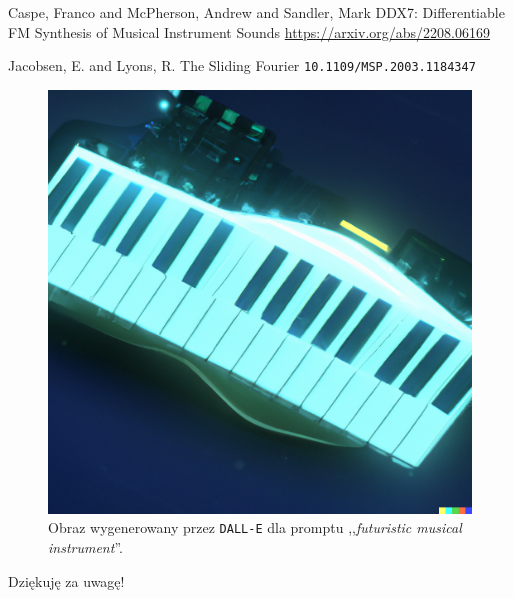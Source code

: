 \documentclass[]{beamer}
\begin{document}
\begin{frame}
  \begin{thebibliography}{99} %

     Caspe, Franco and McPherson, Andrew and Sandler, Mark
    \newblock DDX7: Differentiable FM Synthesis of Musical Instrument Sounds
    \newblock \url{https://arxiv.org/abs/2208.06169}

     Jacobsen, E. and Lyons, R.
    \newblock The Sliding Fourier
    \newblock \texttt{10.1109/MSP.2003.1184347}

  \end{thebibliography}
\end{frame}

\begin{frame}

  \vspace{-0.5cm}
  \begin{figure}
    \includegraphics[width=0.4\linewidth]{ending.png}
    \caption{Obraz wygenerowany przez \texttt{DALL-E} dla promptu ,,\textit{futuristic musical instrument}''.}
  \end{figure}

  \centering
  \Large
  Dziękuję za uwagę!
\end{frame}


\end{document}
